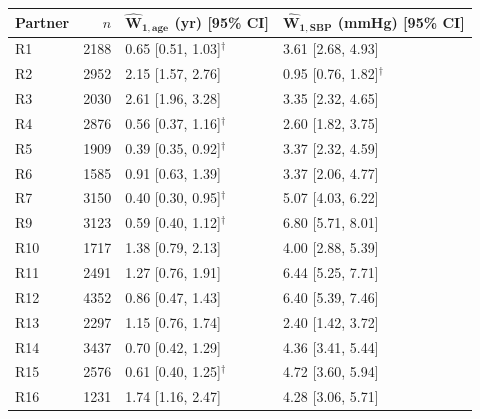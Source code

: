\begin{tabular}{lrll}
\toprule
\textbf{Partner} & $n$ & $\boldsymbol{\widehat{W}_{1,\text{age}}}$ \textbf{(yr) [95\% CI]} & $\boldsymbol{\widehat{W}_{1,\text{SBP}}}$ \textbf{(mmHg) [95\% CI]} \\
\midrule
R1 & 2188 & 0.65 [0.51, 1.03]$^\dagger$ & 3.61 [2.68, 4.93] \\
R2 & 2952 & 2.15 [1.57, 2.76] & 0.95 [0.76, 1.82]$^\dagger$ \\
R3 & 2030 & 2.61 [1.96, 3.28] & 3.35 [2.32, 4.65] \\
R4 & 2876 & 0.56 [0.37, 1.16]$^\dagger$ & 2.60 [1.82, 3.75] \\
R5 & 1909 & 0.39 [0.35, 0.92]$^\dagger$ & 3.37 [2.32, 4.59] \\
R6 & 1585 & 0.91 [0.63, 1.39] & 3.37 [2.06, 4.77] \\
R7 & 3150 & 0.40 [0.30, 0.95]$^\dagger$ & 5.07 [4.03, 6.22] \\
R9 & 3123 & 0.59 [0.40, 1.12]$^\dagger$ & 6.80 [5.71, 8.01] \\
R10 & 1717 & 1.38 [0.79, 2.13] & 4.00 [2.88, 5.39] \\
R11 & 2491 & 1.27 [0.76, 1.91] & 6.44 [5.25, 7.71] \\
R12 & 4352 & 0.86 [0.47, 1.43] & 6.40 [5.39, 7.46] \\
R13 & 2297 & 1.15 [0.76, 1.74] & 2.40 [1.42, 3.72] \\
R14 & 3437 & 0.70 [0.42, 1.29] & 4.36 [3.41, 5.44] \\
R15 & 2576 & 0.61 [0.40, 1.25]$^\dagger$ & 4.72 [3.60, 5.94] \\
R16 & 1231 & 1.74 [1.16, 2.47] & 4.28 [3.06, 5.71] \\
\bottomrule
\end{tabular}
